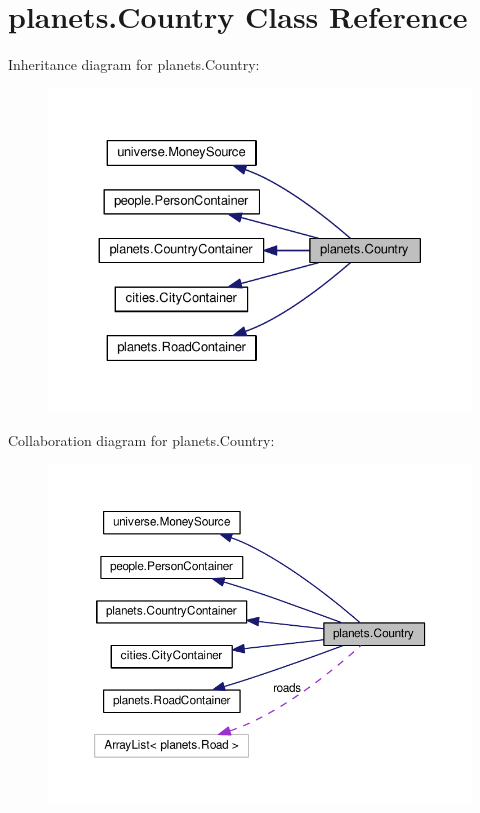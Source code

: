 \hypertarget{classplanets_1_1_country}{}\section{planets.\+Country Class Reference}
\label{classplanets_1_1_country}


Inheritance diagram for planets.\+Country\+:\nopagebreak
\begin{figure}[H]
\begin{center}
\leavevmode
\includegraphics[width=330pt]{classplanets_1_1_country__inherit__graph}
\end{center}
\end{figure}


Collaboration diagram for planets.\+Country\+:\nopagebreak
\begin{figure}[H]
\begin{center}
\leavevmode
\includegraphics[width=350pt]{classplanets_1_1_country__coll__graph}
\end{center}
\end{figure}
